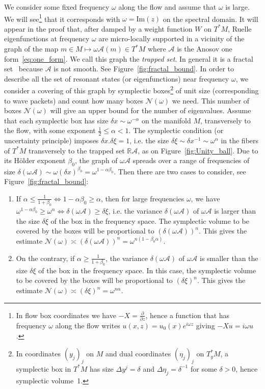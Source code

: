 \documentclass[10pt]{amsart}
\theoremstyle{definition}\newtheorem{defi}[theo]{Definition}\newtheorem{rema}[theo]{Remark}\newtheorem{exam}[theo]{Example}\newtheorem{exem}[theo]{Example}\newtheorem{nota}[theo]{Notation}
\newcommand{\clA}{\mathcal{A}}
\newcommand{\clN}{\mathcal{N}}
\newcommand{\Imm}{\mathrm{Im}}
\newcommand{\bbR}{\mathbb{R}}
\newcommand{\scrA}{\mathscr{A}}
\begin{document}
We consider some fixed frequency $\omega$ along the flow and assume that $\omega$ is large. We will see\footnote{In flow box coordinates we have $-X=\frac{\partial}{\partial z}$, hence a function that has frequency $\omega$ along the flow writes $u(x,z)=u_{0}(x)e^{i\omega z}$ giving $-Xu=i\omega u$.} that it corresponds with $\omega=\Imm(z)$ on the spectral domain. It will appear in the proof that, after damped by a weight function $W$ on $T^{*}M$, Ruelle eigenfunctions at frequency $\omega$ are micro-locally supported in a vicinity of the graph of the map $m\in M\mapsto\omega\scrA(m)\in T^{*}M$ where $\scrA$ is the Anosov one form~\eqref{eq:one_form}. We call this graph the \emph{trapped set}. In general it is a fractal set~\cite[Chap.11]{falconer_03_book} because $\scrA$ is not smooth. See Figure~\ref{fig:fractal_bound}. In order to describe all the set of resonant states (or eigenfunctions) near frequency $\omega$, we consider a covering of this graph by symplectic boxes\footnote{In coordinates $(y_{j})_{j}$ on $M$ and dual coordinates $(\eta_{j})_{j}$ on $T_{y}^{*}M$, a symplectic box in $T^{*}M$ has size $\Delta y^{j}=\delta$ and $\Delta\eta_{j}=\delta^{-1}$ for some $\delta>0$, hence symplectic volume~1.} of unit size (corresponding to wave packets) and count how many boxes $\clN(\omega)$ we need. This number of boxes $\clN(\omega)$ will give an upper bound for the number of eigenvalues. Assume that each symplectic box has size $\delta x\sim\omega^{-\alpha}$ on the manifold $M$, transversely to the flow, with some exponent $\frac{1}{2}\leq\alpha<1$. The symplectic condition (or uncertainty principle) imposes $\delta x.\delta\xi=1$, i.e. the size $\delta\xi\sim\delta x^{-1}\sim\omega^{\alpha}$ in the fibers of $T^{*}M$ transversely to the trapped set $\bbR\scrA$, as on Figure~\ref{fig:Unity_ball}. Due to its H\"older exponent $\beta_{0}$, the graph of $\omega\scrA$ spreads over a range of frequencies of size {\small{}$\delta(\omega\scrA)\sim\omega(\delta x)^{\beta_{0}}=\omega^{1-\alpha\beta_{0}}$}. Then there are two cases to consider, see Figure~\ref{fig:fractal_bound}:
\begin{enumerate}
\item If $\alpha\leq\frac{1}{1+\beta_{0}}\Leftrightarrow1-\alpha\beta_{0}\geq\alpha$, then for large frequencies $\omega$, we have $\omega^{1-\alpha\beta_{0}}\geq\omega^{\alpha}\Leftrightarrow\delta(\omega\clA)\geq\delta\xi$, i.e. the variance $\delta(\omega\clA)$ of $\omega\clA$ is larger than the size $\delta\xi$ of the box in the frequency space. The symplectic volume to be covered by the boxes will be proportional to $(\delta(\omega\clA))^{n}$. This gives the estimate $\clN(\omega)\asymp(\delta(\omega\clA))^{n}=\omega^{n(1-\beta_{0}\alpha)}$.
\item On the contrary, if $\alpha\geq\frac{1}{1+\beta_{0}}$, the variance $\delta(\omega\clA)$ of $\omega\clA$ is smaller than the size $\delta\xi$ of the box in the frequency space. In this case, the symplectic volume to be covered by the boxes will be proportional to $(\delta\xi)^{n}$. This gives the estimate $\clN(\omega)\asymp(\delta\xi)^{n}=\omega^{n\alpha}$.
\end{enumerate}
\end{document}
